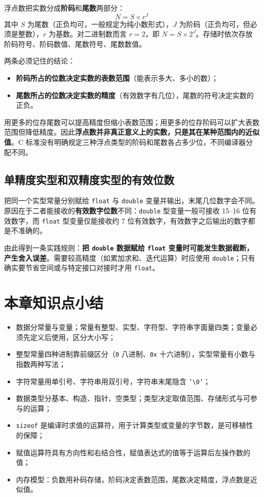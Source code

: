 浮点数把实数分成\textbf{阶码}和\textbf{尾数}两部分：
\[
N = S \times r^{J}
\]
其中 $S$ 为尾数（正负均可，一般规定为纯小数形式），$J$ 为阶码（正负均可，但必须是整数），$r$ 为基数。对二进制数而言 $r=2$，即 $N=S\times 2^{J}$。存储时依次存放阶码符号、阶码数值、尾数符号、尾数数值。

两条必须记住的结论：

\begin{itemize}
  \item \textbf{阶码所占的位数决定实数的表数范围}（能表示多大、多小的数）；
  \item \textbf{尾数所占的位数决定实数的精度}（有效数字有几位），尾数的符号决定实数的正负。
\end{itemize}

用更多的位存尾数可以提高精度但缩小表数范围；用更多的位存阶码可以扩大表数范围但降低精度。因此\textbf{浮点数并非真正意义上的实数，只是其在某种范围内的近似值}。C 标准没有明确规定三种浮点类型的阶码和尾数各占多少位，不同编译器分配不同。

\subsection{单精度实型和双精度实型的有效位数}

把同一个实型常量分别赋给 \texttt{float} 与 \texttt{double} 变量并输出，末尾几位数字会不同。原因在于二者能接收的\textbf{有效数字位数}不同：\texttt{double} 型变量一般可接收 15--16 位有效数字，而 \texttt{float} 型变量仅能接收约 7 位有效数字，有效数字之后输出的数字都是不准确的。

由此得到一条实践规则：\textbf{把 \texttt{double} 数据赋给 \texttt{float} 变量时可能发生数据截断，产生舍入误差}。需要较高精度（如累加求和、迭代运算）时应使用 \texttt{double}；只有确实要节省空间或与特定接口对接时才用 \texttt{float}。

\section{本章知识点小结}

\begin{itemize}
  \item 数据分常量与变量；常量有整型、实型、字符型、字符串字面量四类；变量必须先定义后使用，区分大小写；
  \item 整型常量四种进制靠前缀区分（\texttt{0} 八进制、\texttt{0x} 十六进制），实型常量有小数与指数两种写法；
  \item 字符常量用单引号、字符串用双引号，字符串末尾隐含 \texttt{'\textbackslash 0'}；
  \item 数据类型分基本、构造、指针、空类型；类型决定取值范围、存储形式与可参与的运算；
  \item \texttt{sizeof} 是编译时求值的运算符，用于计算类型或变量的字节数，是可移植性的保障；
  \item 赋值运算符具有方向性和右结合性，赋值表达式的值等于运算后左操作数的值；
  \item 内存模型：负数用补码存储，阶码决定表数范围，尾数决定精度，浮点数是近似值。
\end{itemize}

